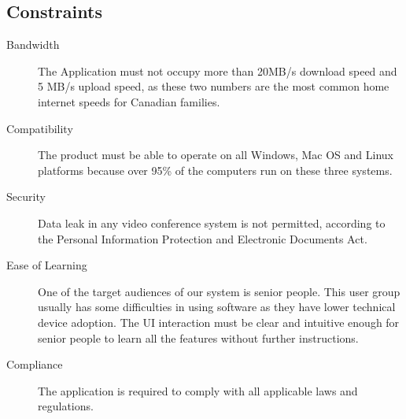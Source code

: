 \documentclass[12pt]{article}
\begin{document}
\subsection{Constraints}
\begin{description}
    \item[Bandwidth] The Application must not occupy more than 20MB/s download speed\cite{downloadSpeed2018} and 5 MB/s upload speed\cite{uploadSpeed2021}, as these two numbers are the most common home internet speeds for Canadian families.
    \item[Compatibility] The product must be able to operate on all Windows, Mac OS and Linux platforms because over 95\% of the computers run on these three systems\cite{OSMarketShare}.
    \item[Security] Data leak in any video conference system is not permitted, according to the Personal Information Protection and Electronic Documents Act\cite{Law1}.
    \item[Ease of Learning] One of the target audiences of our system is senior people. This user group usually has some difficulties in using software as they have lower technical device adoption\cite{olderAdultsTechUse}. The UI interaction must be clear and intuitive enough for senior people to learn all the features without further instructions.
    \item[Compliance] The application is required to comply with all applicable laws\cite{Law1}\cite{Law2}\cite{Law3} and regulations.
\end{description}
\end{document}
